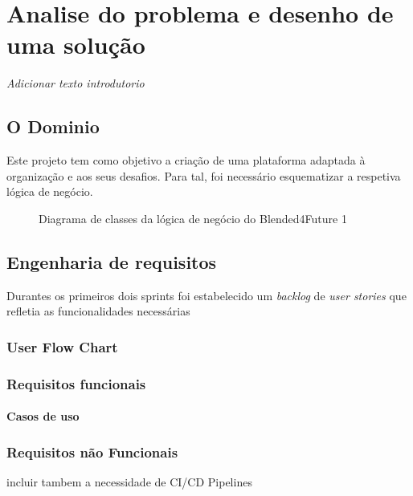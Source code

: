 \chapter{Analise do problema e desenho de uma solução}
\label{chap:analisedoproblema}

\textit{Adicionar texto introdutorio}

\section{O Dominio}

Este projeto tem como objetivo a criação de uma plataforma adaptada à organização e aos seus desafios. Para tal, foi necessário esquematizar a respetiva lógica de negócio.

\begin{figure}    
    \centering
    \caption{Diagrama de classes da lógica de negócio do Blended4Future 1}
    \label{fig:cd}
\end{figure}


\section{Engenharia de requisitos}

Durantes os primeiros dois sprints foi estabelecido um \textit{backlog} de \textit{user stories} que refletia as funcionalidades necessárias


\subsection{User Flow Chart}

\subsection{Requisitos funcionais}

\subsubsection{Casos de uso}

\subsection{Requisitos não Funcionais}

incluir tambem a necessidade de CI/CD Pipelines

